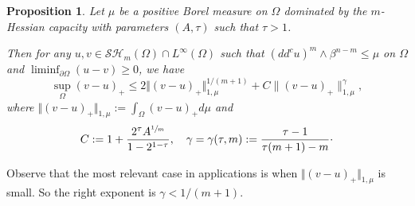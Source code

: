 \documentclass[11pt]{article}
\numberwithin{equation}{section}
\newtheorem{proposition}[theorem]{Proposition}
\theoremstyle{definition}
\theoremstyle{plain}
\theoremstyle{definition}
\begin{document}
\begin{proposition} \label{prop:stability} Let $\mu$ be a positive Borel measure on $\Omega$ dominated by the $m$\nobreakdash-Hessian capacity with parameters $(A, \tau)$ such that $\tau > 1$.

Then for any $u, v \in \mathcal {SH}_m (\Omega) \cap L^{\infty} (\Omega)$ such that $(dd^c u)^m \wedge \beta^{n - m} \leq \mu$ on $\Omega$ and $\liminf_{\partial \Omega} (u - v) \geq 0$, we have
\begin{equation} \label{eq:stability}
\sup_{\Omega} (v - u)_+ \leq 2 \Vert (v-u)_+\Vert_{1,\mu}^{1 \slash (m+1)} + C \|(v-u)_+\|^\gamma_{1,\mu},
\end{equation}
where $\Vert (v-u)_+ \Vert_{1,\mu}:= \int_{\Omega} (v-u)_+ d \mu$ and
\begin{equation} \label{eq:stbilityconstant}
C:= 1 + \frac{2^{\tau} A^{\sfrac{1}{m}}}{1-2^{1 -\tau}}, \quad \gamma = \gamma (\tau,m):= \frac{\tau - 1}{\tau (m + 1) - m }\cdot
\end{equation}
\end{proposition}
Observe that the most relevant case in applications is when $\Vert (v-u)_+ \Vert_{1,\mu}$ is small. So the right exponent is $\gamma < 1 \slash (m +1)$.
\end{document}
